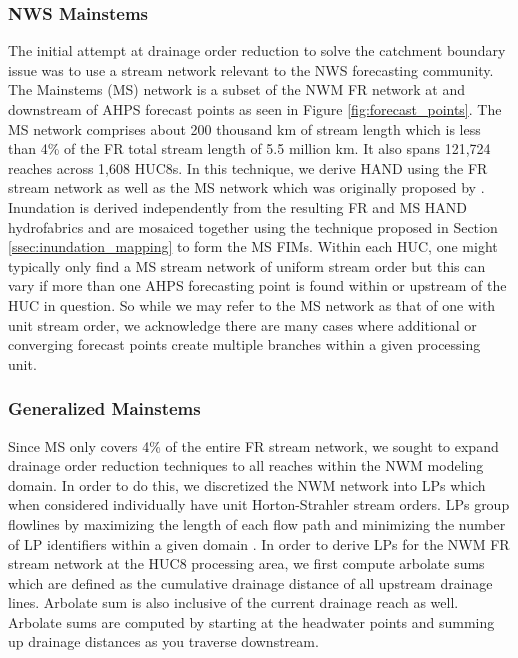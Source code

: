\documentclass[draft]{dependencies/agujournal2019}
\begin{document}
\subsubsection{NWS Mainstems}
\label{sssec:nws_mainstems}
%
The initial attempt at drainage order reduction to solve the catchment boundary issue was to use a stream network relevant to the NWS forecasting community. 
The Mainstems (MS) network is a subset of the NWM FR network at and downstream of AHPS forecast points as seen in Figure \ref{fig:forecast_points}.
The MS network comprises about 200 thousand km of stream length which is less than 4\% of the FR total stream length of 5.5 million km.
It also spans 121,724 reaches across 1,608 HUC8s.
In this technique, we derive HAND using the FR stream network as well as the MS network which was originally proposed by .
Inundation is derived independently from the resulting FR and MS HAND hydrofabrics and are mosaiced together using the technique proposed in Section \ref{ssec:inundation_mapping} to form the MS FIMs. 
Within each HUC, one might typically only find a MS stream network of uniform stream order but this can vary if more than one AHPS forecasting point is found within or upstream of the HUC in question.
So while we may refer to the MS network as that of one with unit stream order, we acknowledge there are many cases where additional or converging forecast points create multiple branches within a given processing unit.
%
\subsubsection{Generalized Mainstems}
\label{sssec:generalized_mainstems}
%
Since MS only covers 4\% of the entire FR stream network, we sought to expand drainage order reduction techniques to all reaches within the NWM modeling domain.
In order to do this, we discretized the NWM network into LPs which when considered individually have unit Horton-Strahler stream orders.
LPs group flowlines by maximizing the length of each flow path and minimizing the number of LP identifiers within a given domain \cite{moore2019user,mckay2012nhdplus}. 
In order to derive LPs for the NWM FR stream network at the HUC8 processing area, we first compute arbolate sums which are defined as the cumulative drainage distance of all upstream drainage lines.
Arbolate sum is also inclusive of the current drainage reach as well.
Arbolate sums are computed by starting at the headwater points and summing up drainage distances as you traverse downstream.
\end{document}
